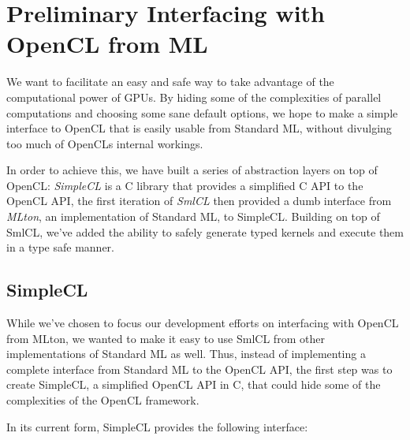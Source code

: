 \section{Preliminary Interfacing with OpenCL from ML}

We want to facilitate an easy and safe way to take advantage of the
computational power of GPUs. By hiding some of the complexities of
parallel computations and choosing some sane default options, we hope
to make a simple interface to OpenCL that is easily usable from
Standard ML, without divulging too much of OpenCLs internal workings.

In order to achieve this, we have built a series of abstraction layers
on top of OpenCL: \emph{SimpleCL} is a C library that provides a
simplified C API to the OpenCL API, the first iteration of \emph{SmlCL} then
provided a dumb interface from \emph{MLton}, an implementation of Standard
ML, to SimpleCL. Building on top of SmlCL, we've added the ability to
safely generate typed kernels and execute them in a type safe manner.

\subsection{SimpleCL}

While we've chosen to focus our development efforts on interfacing
with OpenCL from MLton, we wanted to make it easy to use SmlCL from
other implementations of Standard ML as well. Thus, instead of
implementing a complete interface from Standard ML to the OpenCL API,
the first step was to create SimpleCL, a simplified OpenCL API in C,
that could hide some of the complexities of the OpenCL framework.

In its current form, SimpleCL provides the following interface:

